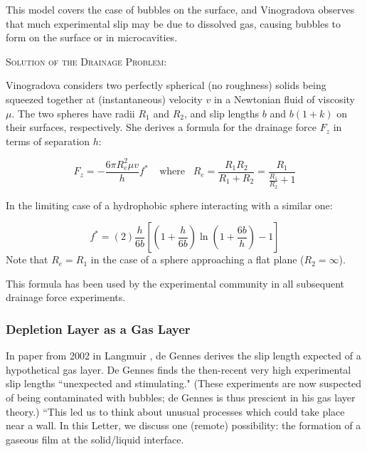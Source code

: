 \documentclass[12pt, a4paper, twoside, openright]{book}
\newcommand{\paper}[1]
         {\colorbox[gray]{0.8}{ \textsc{#1}}
         
         }
\begin{document}

This model covers the case of bubbles on the surface, and Vinogradova observes that much experimental slip may be due to dissolved gas, causing bubbles to form on the surface or in microcavities.

\clearpage
\paper{Solution of the Drainage Problem:}
Vinogradova considers two perfectly spherical (no roughness) solids being squeezed together at (instantaneous) velocity $v$ in a Newtonian fluid of viscosity $\mu$. The two spheres have radii $R_{1}$ and $R_{2}$, and slip lengths $b$ and $b(1+k)$ on their surfaces, respectively. 
She derives a formula for the drainage force
$F_{z}$ in terms of separation $h$:

\begin{equation}
F_{z} = - \frac{6 \pi R_{e}^{2} \mu v}{h} f^{*}
 \;\;\;\; \mathrm{where}\;\;\;R_{e} = \frac{R_{1}R_{2}}{R_{1}+R_{2}} = 
 \frac{R_{1}}{\frac{R_{1}}{R_{2}} + 1}
\end{equation} 

 In the limiting case of a hydrophobic sphere interacting with a similar one:
 
\begin{equation}
f^{*} = (2)\frac{h}{6b} \left[ \left(1 + \frac{h}{6b} \right)
 \ln \left(1 + \frac{6b}{h} \right) - 1 \right]
\end{equation}
Note that $R_{e} = R_{1}$ in the case of a sphere approaching a flat plane ($R_{2}=\infty$).

This formula has been used by the experimental community in all subsequent drainage force experiments.

\subsubsection{Depletion Layer as a Gas Layer}

In paper from 2002 in Langmuir \cite{deGennes2002}, de Gennes derives the slip length expected of a hypothetical gas layer.  De Gennes finds the then-recent very high experimental slip lengths ``unexpected and stimulating."  (These experiments are now suspected of being contaminated with bubbles; de Gennes is thus prescient in his gas layer theory.) ``This led us to think about unusual processes which could take place near a wall.  In this Letter, we discuss one (remote) possibility: the formation of a gaseous film at the solid/liquid interface.
\end{document}

